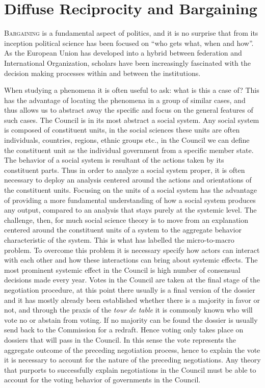 \chapter{Diffuse Reciprocity and Bargaining}

\lettrine{B}{argaining} is a fundamental aspect of politics, and it is no surprise that from its inception political science has been focused on ``who gets what, when and how''.  As the European Union has developed into a hybrid between federation and International Organization, scholars have been increasingly fascinated with the decision making processes within and between the institutions. 

When studying a phenomena it is often useful to ask: what is this a case of? This has the advantage of locating the phenomena in a group of similar cases, and thus allows us to abstract away the specific and focus on the general features of such cases. The Council is in its most abstract a social system. Any social system is composed of constituent units, in the social sciences these units are often individuals, countries, regions, ethnic groups etc., in the Council we can define the constituent unit as the individual government from a specific member state. The behavior of a social system is resultant of the actions taken by its constituent parts. Thus in order to analyze a social system proper, it is often necessary to deploy an analysis centered around the actions and orientations of the constituent units. Focusing on the units of a social system has the advantage of providing a more fundamental understanding of how a social system produces any output, compared to an analysis that stays purely at the systemic level. The challenge, then, for much social science theory is to move from an explanation centered around the constituent units of a system to the aggregate behavior characteristic of the system. This is what \citet{Coleman1990} has labelled the micro-to-macro problem. To overcome this problem it is necessary specify how actors can interact with each other and how these interactions can bring about systemic effects. The most prominent systemic effect in the Council is high number of consensual decisions made every year. Votes in the Council are taken at the final stage of the negotiation procedure, at this point there usually is a final version of the dossier and it has mostly already been established whether there is a majority in favor or not, and through the praxis of the \textsl{tour de table} it is commonly known who will vote no or abstain from voting. If no majority can be found the dossier is usually send back  to the Commission for a redraft. Hence voting only takes place on dossiers that will pass in the Council. In this sense the vote represents the aggregate outcome of the preceding negotiation process, hence to explain the vote it is necessary to account for the nature of the preceding negotiations. Any theory that purports to successfully explain negotiations in the Council must be able to account for the voting behavior of governments in the Council.

